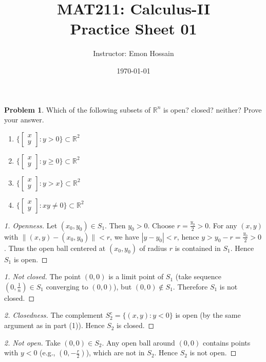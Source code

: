\documentclass[11pt,a4paper]{article}
\title{\textbf{MAT211: Calculus-II}\\
\large Practice Sheet 01}
\author{Instructor: Emon Hossain}
\date{\today}
\theoremstyle{definition}
\newtheorem{problem}[definition]{Problem}
\theoremstyle{plain}
\newcommand{\R}{\mathbb{R}}
\begin{document}
\maketitle
\begin{problem}
Which of the following subsets of $\R^n$ is open? closed? neither? Prove your answer.
\begin{enumerate}
	\item $\biggl\{ \begin{bmatrix} x \\ y \end{bmatrix} : y > 0 \biggl\} \subset \R^2$
	\item $\biggl\{ \begin{bmatrix} x \\ y \end{bmatrix} : y \geq 0 \biggl\} \subset \R^2$
	\item $\biggl\{ \begin{bmatrix} x \\ y \end{bmatrix} : y > x \biggl\} \subset \R^2$
	\item $\biggl\{ \begin{bmatrix} x \\ y \end{bmatrix} : xy \neq 0 \biggl\} \subset \R^2$
\end{enumerate}
\end{problem}
\begin{proof}[1. Openness]
	Let \((x_0, y_0) \in S_1\). Then \(y_0 > 0\). Choose \(r = \frac{y_0}{2} > 0\). For any \((x,y)\) with \(\|(x,y)-(x_0,y_0)\| < r\), we have \(|y-y_0| < r\), hence \(y > y_0 - r = \frac{y_0}{2} > 0\). Thus the open ball centered at \((x_0,y_0)\) of radius \(r\) is contained in \(S_1\). Hence \(S_1\) is open.
\end{proof}

\begin{proof}[1. Not closed]
	The point \((0,0)\) is a limit point of \(S_1\) (take sequence \((0,\frac{1}{n}) \in S_1\) converging to \((0,0)\)), but \((0,0) \notin S_1\). Therefore \(S_1\) is not closed.
\end{proof}

\begin{proof}[2. Closedness]
	The complement \(S_2^c = \{(x,y) : y < 0\}\) is open (by the same argument as in part (1)). Hence \(S_2\) is closed.
\end{proof}

\begin{proof}[2. Not open]
	Take \((0,0) \in S_2\). Any open ball around \((0,0)\) contains points with \(y < 0\) (e.g., \((0,-\frac{r}{2})\)), which are not in \(S_2\). Hence \(S_2\) is not open.
\end{proof}
\end{document}
